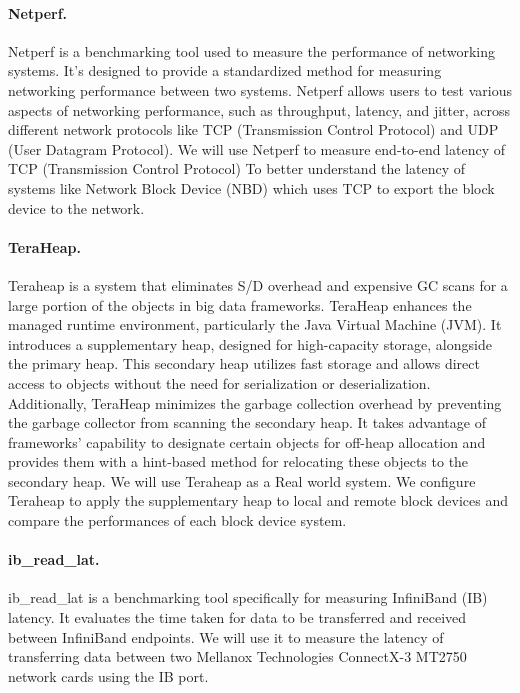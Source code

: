\paragraph{Netperf.} 
Netperf is a benchmarking tool used to measure the performance of networking
systems. It's designed to provide a standardized method for measuring networking
performance between two systems. Netperf allows users to test various aspects of
networking performance, such as throughput, latency, and jitter, across
different network protocols like TCP (Transmission Control Protocol) and UDP
(User Datagram Protocol). We will use Netperf to measure end-to-end latency of
TCP (Transmission Control Protocol) To better understand the latency of systems
like Network Block Device (NBD) which uses TCP to export the block device to the
network.

\paragraph{TeraHeap.} Teraheap is a system that eliminates S/D overhead and expensive GC scans for a
large portion of the objects in big data frameworks. TeraHeap enhances the
managed runtime environment, particularly the Java Virtual Machine (JVM). It
introduces a supplementary heap, designed for high-capacity storage, alongside
the primary heap. This secondary heap utilizes fast storage and allows direct
access to objects without the need for serialization or deserialization.
Additionally, TeraHeap minimizes the garbage collection overhead by preventing
the garbage collector from scanning the secondary heap. It takes advantage of
frameworks' capability to designate certain objects for off-heap allocation and
provides them with a hint-based method for relocating these objects to the
secondary heap. We will use Teraheap as a Real world system. We configure Teraheap to apply the supplementary heap to local and remote block devices and compare the performances of each block device system.

\paragraph{ib\_read\_lat.} ib\_read\_lat is a benchmarking tool specifically for measuring InfiniBand (IB) latency. It evaluates the time taken for data to be transferred and received between InfiniBand endpoints. We will use it to measure the latency of transferring data between two Mellanox Technologies ConnectX-3 MT2750 network cards using the IB port.

